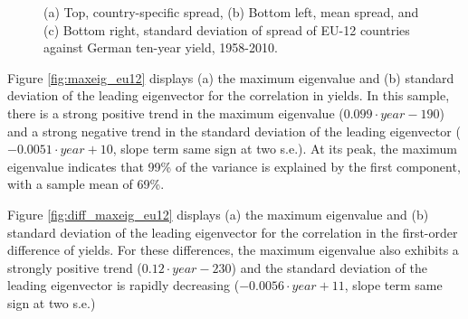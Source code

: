 \documentclass[3p]{elsarticle}
\begin{document}
\begin{figure}[ht!]
\begin{tabular}{cc}
	\end{tabular}
	\caption{(a) Top, country-specific spread, (b) Bottom left, mean spread, and (c) Bottom right, standard deviation of spread of EU-12 countries against German ten-year yield, 1958-2010.}
	\label{fig:de_spread_eu12}
\end{figure}


Figure \ref{fig:maxeig_eu12} displays (a) the maximum eigenvalue and (b) standard deviation of the leading eigenvector for the correlation in yields.  In this sample, there is a strong positive trend in the maximum eigenvalue ($0.099 \cdot year - 190$) and a strong negative trend in the standard deviation of the leading eigenvector ($-0.0051 \cdot year + 10$, slope term same sign at two s.e.).  At its peak, the maximum  eigenvalue indicates that 99\% of the variance is explained by the first component, with a sample mean of 69\%.

Figure \ref{fig:diff_maxeig_eu12} displays (a) the maximum eigenvalue and (b) standard deviation of the leading eigenvector for the correlation in the first-order difference of yields.  For these differences, the maximum eigenvalue also exhibits a strongly positive trend ($0.12 \cdot year - 230$) and the standard deviation of the leading eigenvector is rapidly decreasing ($-0.0056 \cdot year + 11$, slope term same sign at two s.e.)
\end{document}
